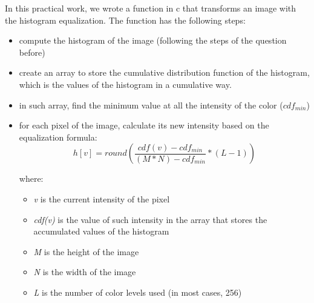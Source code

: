 \documentclass{article}
\begin{document}
	In this practical work, we wrote a function in c that transforms an image with the histogram equalization. The function has the following steps:
	\begin{itemize}
  		\item compute the histogram of the image (following the steps of the question before)
  		\item create an array to store the cumulative distribution function of the histogram, which is the values of the histogram in a cumulative way.
  		\item in such array, find the minimum value at all the intensity of the color ($cdf_{min}$)
  		\item for each pixel of the image, calculate its new intensity based on the equalization formula:
			\begin{equation}
				h[v]= round \left( \frac{cdf(v)-cdf_{min}}{(M * N) - cdf_{min}} * (L-1) \right) 
			\label{eq:equalization}
			\end{equation}
			
			where:		
			\begin{itemize}
	  			\item {\it v} is the current intensity of the pixel		
		  		\item {\it cdf(v)} is the value of such intensity in the array that stores the accumulated values of the histogram
		  		\item {\it M} is the height of the image		
		  		\item {\it N} is the width of the image
		  		\item {\it L} is the number of color levels used (in most cases, 256)
			\end{itemize}
	\end{itemize}
\end{document}
